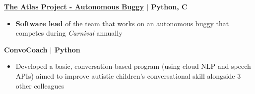 \documentclass[10pt]{article}
\newcommand{\CC}{C\nolinebreak\hspace{-.05em}\raisebox{.4ex}{\tiny\bf +}\nolinebreak\hspace{-.10em}\raisebox{.4ex}{\tiny\bf +}}
\begin{document}
  \textbf{\large \href{https://sites.google.com/view/atlasbuggy/}{The Atlas Project - Autonomous Buggy} $\mid$ Python, \CC} 
  \vspace*{-0.17cm}
  \begin{itemize}
    \itemsep0em
    \item \textcolor{lighterG}{\textbf{Software lead} of the team that works on an autonomous buggy that competes during \textit{Carnival} annually}
  \end{itemize}

  \textbf{\large ConvoCoach $\mid$ Python} 
  \vspace*{-0.17cm}
  \begin{itemize}
    \itemsep-0.4em
    \item \textcolor{lighterG}{Developed a basic, conversation-based program (using cloud NLP and speech APIs) aimed to improve autistic children's conversational skill alongside 3 other colleagues}
  \end{itemize}
\end{document}
